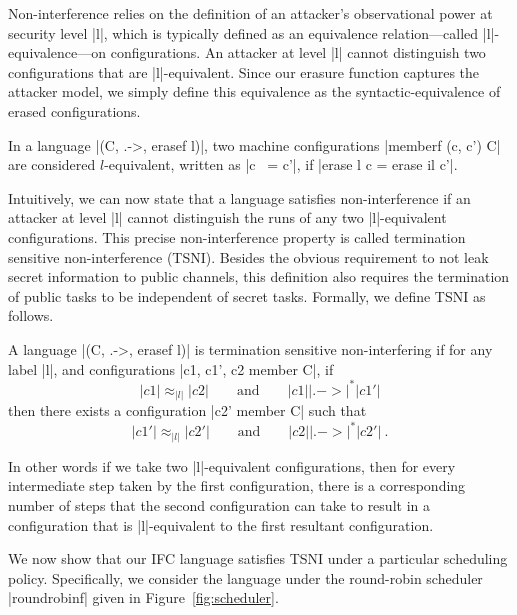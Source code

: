 Non-interference relies on the definition of an attacker's observational power at
security level |l|, which is typically defined as an equivalence
relation---called |l|-equivalence---on configurations.  An attacker
at level |l| cannot
distinguish two configurations that are |l|-equivalent.
%
Since our erasure function captures the attacker model, we simply define this
equivalence as the syntactic-equivalence of erased configurations.
%
\begin{definition}[|l|-equivalence]
    In a language |(C, .->, erasef l)|, two machine configurations
    |memberf (c, c') C| are considered $l$-equivalent, written as |c ~= c'|,
    if |erase l c = erase il c'|.
\end{definition}
%

Intuitively, we can now state that a language satisfies non-interference if an
attacker at level |l| cannot distinguish the runs of any two |l|-equivalent
configurations.
%
This precise non-interference property is called termination sensitive non-interference
(TSNI).  Besides the obvious requirement to not leak secret information
to public channels, this definition also requires the termination
of public tasks to be independent of secret tasks.
%
Formally, we define TSNI as follows.

\begin{definition}
  A language |(C, .->, erasef l)| is termination
  sensitive non-interfering if for any label |l|, and configurations
  |c1, c1', c2 member C|, if
  \begin{equation} \label{eq:tsni-lhs}
    |c1| \approx_{|l|} |c2|
    \qquad \text{and} \qquad
    |c1| |.->|^* |c1'|
  \end{equation}
  then there exists a configuration |c2' member C| such that
  \begin{equation} \label{eq:tsni-rhs}
    |c1'| \approx_{|l|} |c2'|
     \qquad \text{and} \qquad
    |c2| |.->|^* |c2'|
    \ \text{.}
  \end{equation}
\end{definition}
%
In other words if we take two |l|-equivalent configurations, then for every
intermediate step taken by the first configuration, there is a corresponding
number of steps that the second configuration can take to result in a
configuration that is |l|-equivalent to the first resultant configuration.


We now show that our IFC language satisfies TSNI under a particular
scheduling policy.
%
Specifically, we consider the language under the round-robin scheduler
|roundrobinf| given in Figure~\ref{fig:scheduler}.

